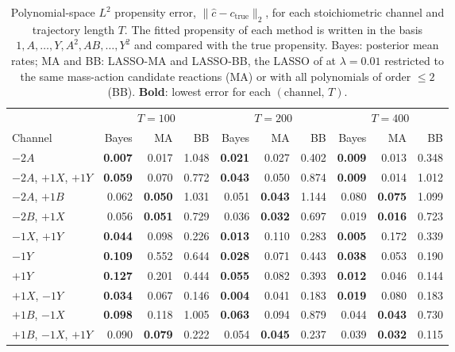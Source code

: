 \begin{table}[htbp]
\centering
\small
\caption{%
  Polynomial-space $L^2$ propensity error, $\|\hat{c} - c_{\mathrm{true}}\|_2$, for each stoichiometric
  channel and trajectory length $T$. The fitted propensity of each method is written in the basis
  $1, A, \dots, Y, A^2, AB, \dots, Y^2$ and compared with the true propensity. Bayes: posterior mean rates;
  MA and BB: LASSO-MA and LASSO-BB, the LASSO of \cite{siam_Zhang2019} at $\lambda = 0.01$
  restricted to the same mass-action candidate reactions (MA) or with all polynomials of order $\le 2$ (BB).
  \textbf{Bold}: lowest error for each $(\text{channel},\,T)$.
}
\label{tab:comparison-l2}
\setlength{\tabcolsep}{3pt}
\begin{tabular}{l rrr rrr rrr}
\toprule
\multicolumn{1}{c}{} & \multicolumn{3}{c}{$T=100$} & \multicolumn{3}{c}{$T=200$} & \multicolumn{3}{c}{$T=400$} \\
\cmidrule(lr){2-4}\cmidrule(lr){5-7}\cmidrule(lr){8-10}
Channel & Bayes & MA & BB & Bayes & MA & BB & Bayes & MA & BB \\
\midrule
$-2A$ & \textbf{0.007} & 0.017 & 1.048 & \textbf{0.021} & 0.027 & 0.402 & \textbf{0.009} & 0.013 & 0.348 \\
$-2A$, $+1X$, $+1Y$ & \textbf{0.059} & 0.070 & 0.772 & \textbf{0.043} & 0.050 & 0.874 & \textbf{0.009} & 0.014 & 1.012 \\
$-2A$, $+1B$ & 0.062 & \textbf{0.050} & 1.031 & 0.051 & \textbf{0.043} & 1.144 & 0.080 & \textbf{0.075} & 1.099 \\
$-2B$, $+1X$ & 0.056 & \textbf{0.051} & 0.729 & 0.036 & \textbf{0.032} & 0.697 & 0.019 & \textbf{0.016} & 0.723 \\
$-1X$, $+1Y$ & \textbf{0.044} & 0.098 & 0.226 & \textbf{0.013} & 0.110 & 0.283 & \textbf{0.005} & 0.172 & 0.339 \\
$-1Y$ & \textbf{0.109} & 0.552 & 0.644 & \textbf{0.028} & 0.071 & 0.443 & \textbf{0.038} & 0.053 & 0.190 \\
$+1Y$ & \textbf{0.127} & 0.201 & 0.444 & \textbf{0.055} & 0.082 & 0.393 & \textbf{0.012} & 0.046 & 0.144 \\
$+1X$, $-1Y$ & \textbf{0.034} & 0.067 & 0.146 & \textbf{0.004} & 0.041 & 0.183 & \textbf{0.019} & 0.080 & 0.183 \\
$+1B$, $-1X$ & \textbf{0.098} & 0.118 & 1.005 & \textbf{0.063} & 0.094 & 0.879 & 0.044 & \textbf{0.043} & 0.730 \\
$+1B$, $-1X$, $+1Y$ & 0.090 & \textbf{0.079} & 0.222 & 0.054 & \textbf{0.045} & 0.237 & 0.039 & \textbf{0.032} & 0.115 \\

\end{tabular}
\end{table}
